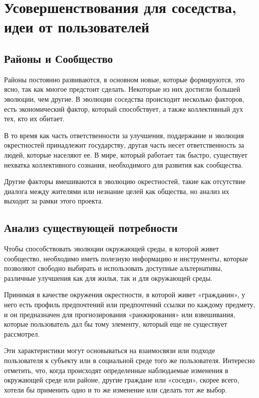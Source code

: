 \newpage
\section{Усовершенствования для соседства, идеи от пользователей}

\subsection{Районы и Сообщество}

Районы постоянно развиваются, в основном новые, которые формируются, это ясно, так как многое предстоит сделать. Некоторые из них достигли большей эволюции, чем другие. В эволюции соседства происходит несколько факторов, есть экономический фактор, который способствует, а также коллективный дух тех, кто их обитает.

В то время как часть ответственности за улучшения, поддержание и эволюция окрестностей принадлежит государству, другая часть несет ответственность за людей, которые населяют ее. В мире, который работает так быстро, существует нехватка коллективного сознания, необходимого для развития как сообщества.

Другие факторы вмешиваются в эволюцию окрестностей, такие как отсутствие диалога между жителями или незнание целей как общества, но анализ их выходит за рамки этого проекта.

\subsection{Анализ существующей потребности}

Чтобы способствовать эволюции окружающей среды, в которой живет сообщество, необходимо иметь полезную информацию и инструменты, которые позволяют свободно выбирать и использовать доступные альтернативы, различные улучшения как для жилья, так и для окружающей среды.

Принимая в качестве окружения окрестности, в которой живет «гражданин», у него есть профиль предпочтений или предпочтений ссылки по каждому предмету, и он предназначен для прогнозирования «ранжирования» или взвешивания, которые пользователь дал бы тому элементу, который еще не существует рассмотрел.

Эти характеристики могут основываться на взаимосвязи или подходе пользователя к субъекту или в социальной среде того же пользователя. Интересно отметить, что, когда происходят определенные наблюдаемые изменения в окружающей среде или районе, другие граждане или «соседи», скорее всего, хотели бы применить одно и то же изменение или сделать тот же выбор.

